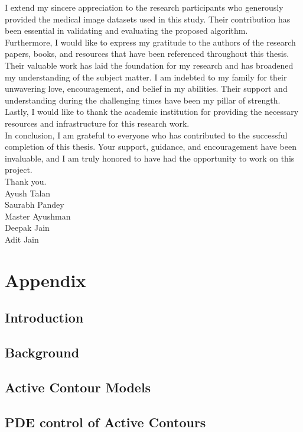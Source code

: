 \documentclass[]{report}
\begin{document}
I extend my sincere appreciation to the research participants who generously provided the medical image datasets used in this study. Their contribution has been essential in validating and evaluating the proposed algorithm.\\

Furthermore, I would like to express my gratitude to the authors of the research papers, books, and resources that have been referenced throughout this thesis. Their valuable work has laid the foundation for my research and has broadened my understanding of the subject matter.
I am indebted to my family for their unwavering love, encouragement, and belief in my abilities. Their support and understanding during the challenging times have been my pillar of strength.\\

Lastly, I would like to thank the academic institution for providing the necessary resources and infrastructure for this research work.\\

In conclusion, I am grateful to everyone who has contributed to the successful completion of this thesis. Your support, guidance, and encouragement have been invaluable, and I am truly honored to have had the opportunity to work on this project.\\

Thank you.\\

Ayush Talan\\
Saurabh Pandey\\
Master Ayushman\\
Deepak Jain\\
Adit Jain\\

\chapter*{Appendix}
\appendix
\section{Introduction}
\section{Background}
\section{Active Contour Models}
\section{PDE control of Active Contours}
\end{document}

